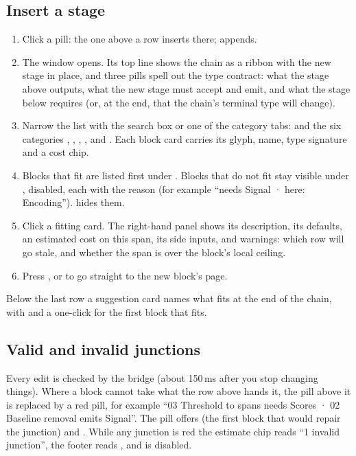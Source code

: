 \subsection*{Insert a stage}
\begin{enumerate}
  \item Click a  pill: the one above a row inserts there;  appends.
  \item The  window opens. Its top line shows the chain as a ribbon with the
        new stage in place, and three pills spell out the type contract: what the stage above
        outputs, what the new stage must accept and emit, and what the stage below requires (or,
        at the end, that the chain's terminal type will change).
  \item Narrow the list with the search box or one of the category tabs:  and the six
        categories , , , ,  and
        . Each block card carries its glyph, name, type signature and a cost chip.
  \item Blocks that fit are listed first under . Blocks that do not fit stay
        visible under , disabled, each with the reason (for example
        ``needs Signal · here: Encoding'').  hides them.
  \item Click a fitting card. The right-hand panel shows its description, its defaults, an
        estimated cost on this span, its side inputs, and warnings: which row will go stale,
        and whether the span is over the block's local ceiling.
  \item Press , or  to go straight
        to the new block's page.
\end{enumerate}
Below the last row a suggestion card names what fits at the end of the chain, with
 and a one-click  for the first block that fits.


\subsection*{Valid and invalid junctions}
Every edit is checked by the bridge (about 150\,ms after you stop changing things). Where a block
cannot take what the row above hands it, the  pill above it is replaced by a red
pill, for example ``03 Threshold to spans needs Scores · 02 Baseline removal emits Signal''. The
pill offers  (the first block that would repair the junction) and
. While any junction is red the estimate chip reads ``1 invalid
junction'', the footer reads , and  is disabled.

